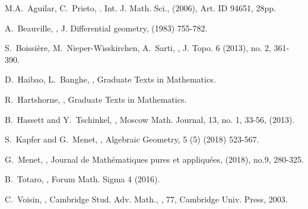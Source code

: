 \documentclass[a4paper]{article}
\theoremstyle{remark}
\begin{document}
\begin{thebibliography}{10}
M.A.~Aguilar, C.~Prieto,
.
\newblock Int. J. Math. Sci.,
\newblock (2006), Art. ID 94651, 28pp.

A.~Beauville,
,
\newblock J. Differential geometry,
 (1983) 755-782.

S.~Boissi\`ere, M.~Nieper-Wisskirchen, A.~Sarti,
,
\newblock J. Topo. 6 (2013), no. 2, 361-390.

D.~Haibao, L.~Banghe,
,
\newblock Graduate Texts in Mathematics.

R.~Hartshorne,
,
\newblock Graduate Texts in Mathematics.

B.~Hassett and Y.~Tschinkel,
,
\newblock  Moscow Math. Journal, 13, no. 1, 33-56, (2013).

S.~Kapfer and G.~Menet,
,
\newblock  Algebraic Geometry, 5 (5) (2018) 523-567.

G.~Menet,
,
\newblock Journal de Math\'ematiques pures et appliqu\'ees, 
 (2018), no.9, 280-325.

B.~Totaro,
,
\newblock Forum Math. Sigma 4 (2016).

C.~Voisin,
,
\newblock Cambridge Stud. Adv. Math.,
, 77, Cambridge Univ. Press, 2003.
\\

\end{thebibliography}
\end{document}
